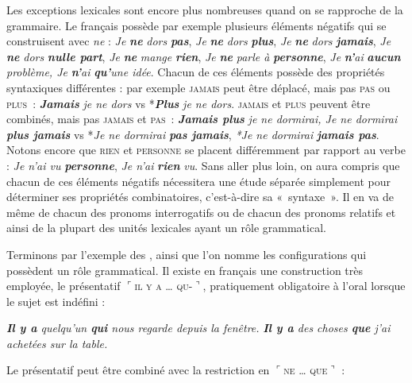 {    Les exceptions lexicales sont encore plus nombreuses quand on se rapproche de la grammaire. Le français possède par exemple plusieurs éléments négatifs qui se construisent avec \textit{ne} : \textit{Je} \textbf{\textit{ne}} \textit{dors} \textbf{\textit{pas}}, \textit{Je} \textbf{\textit{ne}} \textit{dors} \textbf{\textit{plus}}, \textit{Je} \textbf{\textit{ne}} \textit{dors} \textbf{\textit{jamais}}, \textit{Je} \textbf{\textit{ne}} \textit{dors} \textbf{\textit{nulle part}}, \textit{Je} \textbf{\textit{ne}} \textit{mange} \textbf{\textit{rien}}, \textit{Je} \textbf{\textit{ne}} \textit{parle à} \textbf{\textit{personne}}, \textit{Je} \textbf{\textit{n’}}\textit{ai} \textbf{\textit{aucun}} \textit{problème, Je} \textbf{\textit{n’}}\textit{ai} \textbf{\textit{qu’}}\textit{une idée}. Chacun de ces éléments possède des propriétés syntaxiques différentes : par exemple \textsc{jamais} peut être déplacé, mais pas \textsc{pas} ou \textsc{plus~}: \textbf{\textit{Jamais}} \textit{je ne dors} vs *\textbf{\textit{Plus}} \textit{je ne dors}. \textsc{jamais} et \textsc{plus} peuvent être combinés, mais pas \textsc{jamais} et \textsc{pas~}: \textbf{\textit{Jamais plus}} \textit{je ne dormirai, Je ne dormirai} \textbf{\textit{plus jamais}} vs *\textit{Je ne dormirai} \textbf{\textit{pas jamais}}, \textit{*Je ne dormirai} \textbf{\textit{jamais pas}}. Notons encore que \textsc{rien} et \textsc{personne} se placent différemment par rapport au verbe : \textit{Je n’ai vu} \textbf{\textit{personne}}, \textit{Je n’ai} \textbf{\textit{rien}} \textit{vu}. Sans aller plus loin, on aura compris que chacun de ces éléments négatifs nécessitera une étude séparée simplement pour déterminer ses propriétés combinatoires, c’est-à-dire sa «~syntaxe~». Il en va de même de chacun des pronoms interrogatifs ou de chacun des pronoms relatifs et ainsi de la plupart des unités lexicales ayant un rôle grammatical.

    Terminons par l’exemple des , ainsi que l’on nomme les configurations qui possèdent un rôle grammatical. Il existe en français une construction très employée, le présentatif $⌜$\textsc{il y a … qu-}$⌝$, pratiquement obligatoire à l’oral lorsque le sujet est indéfini :

    \ea
    \ea 
    \textit{\textbf{{Il y a}} {quelqu’un} \textbf{{qui}} {nous regarde depuis la fenêtre.}}
    \ex
    \textit{\textbf{{Il y a}} {des choses} \textbf{{que}} {j’ai} {achetées} {sur la table.}}
    \z
    \z

   \noindent Le présentatif peut être combiné avec la restriction en $⌜$\textsc{ne … que}$⌝$ :

}
